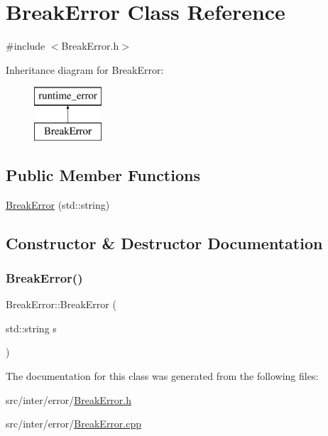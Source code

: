 \hypertarget{class_break_error}{}\section{Break\+Error Class Reference}
\label{class_break_error}


{\ttfamily \#include $<$Break\+Error.\+h$>$}

Inheritance diagram for Break\+Error\+:\begin{figure}[H]
\begin{center}
\leavevmode
\includegraphics[height=2.000000cm]{class_break_error}
\end{center}
\end{figure}
\subsection*{Public Member Functions}
\begin{DoxyCompactItemize}
\item 
\hyperlink{class_break_error_a94dc77c2e9e9088a44b073a9eda03833}{Break\+Error} (std\+::string)
\end{DoxyCompactItemize}


\subsection{Constructor \& Destructor Documentation}
\mbox{\label{class_break_error_a94dc77c2e9e9088a44b073a9eda03833}} 
\subsubsection{\texorpdfstring{Break\+Error()}{BreakError()}}
{\footnotesize\ttfamily Break\+Error\+::\+Break\+Error (\begin{DoxyParamCaption}\item[{std\+::string}]{s }\end{DoxyParamCaption})\hspace{0.3cm}{\ttfamily [explicit]}}



The documentation for this class was generated from the following files\+:\begin{DoxyCompactItemize}
\item 
src/inter/error/\hyperlink{_break_error_8h}{Break\+Error.\+h}\item 
src/inter/error/\hyperlink{_break_error_8cpp}{Break\+Error.\+cpp}\end{DoxyCompactItemize}
